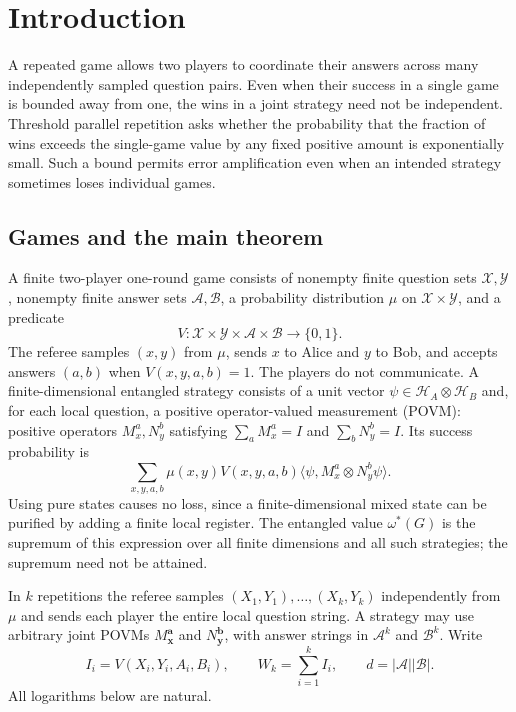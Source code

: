 \section{Introduction}

A repeated game allows two players to coordinate their answers across
many independently sampled question pairs. Even when their success in a
single game is bounded away from one, the wins in a joint strategy need
not be independent. Threshold parallel repetition asks whether the
probability that the fraction of wins exceeds the single-game value by
any fixed positive amount is exponentially small. Such a bound permits
error amplification even when an intended strategy sometimes loses
individual games.

\subsection{Games and the main theorem}

A finite two-player one-round game consists of nonempty finite question
sets $\mathcal X,\mathcal Y$, nonempty finite answer sets
$\mathcal A,\mathcal B$, a probability distribution $\mu$ on
$\mathcal X\times\mathcal Y$, and a predicate
\[
 V:\mathcal X\times\mathcal Y\times\mathcal A\times\mathcal B
       \longrightarrow\{0,1\}.
\]
The referee samples $(x,y)$ from $\mu$, sends $x$ to Alice and $y$ to
Bob, and accepts answers $(a,b)$ when $V(x,y,a,b)=1$. The players do
not communicate. A finite-dimensional entangled strategy consists of
a unit vector $\psi\in\mathcal H_A\otimes\mathcal H_B$ and, for each
local question, a positive operator-valued measurement (POVM):
positive operators $M_x^a,N_y^b$ satisfying
$\sum_aM_x^a=I$ and $\sum_bN_y^b=I$. Its success probability is
\[
 \sum_{x,y,a,b}\mu(x,y)V(x,y,a,b)
     \langle\psi,M_x^a\otimes N_y^b\psi\rangle.
\]
Using pure states causes no loss, since a finite-dimensional mixed state
can be purified by adding a finite local register. The entangled value
$\omega^*(G)$ is the supremum of this expression over all finite
dimensions and all such strategies; the supremum need not be attained.

In $k$ repetitions the referee samples
$(X_1,Y_1),\ldots,(X_k,Y_k)$ independently from $\mu$ and sends each
player the entire local question string. A strategy may use arbitrary
joint POVMs $M_{\mathbf x}^{\mathbf a}$ and
$N_{\mathbf y}^{\mathbf b}$, with answer strings in
$\mathcal A^k$ and $\mathcal B^k$. Write
\[
 I_i=V(X_i,Y_i,A_i,B_i),\qquad W_k=\sum_{i=1}^k I_i,
 \qquad d=|\mathcal A||\mathcal B|.
\]
All logarithms below are natural.

